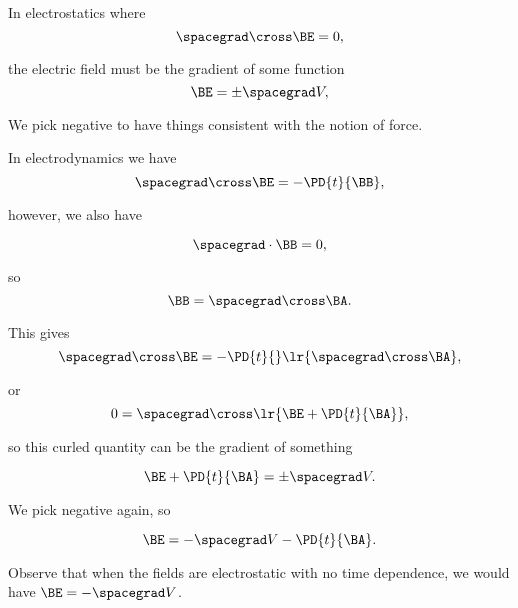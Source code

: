 In electrostatics where
\begin{dmath}\label{eqn:emtLecture10:720}
\spacegrad \cross \BE  = 0,
\end{dmath}

the electric field must be the gradient of some function
\begin{dmath}\label{eqn:emtLecture10:740}
\BE = \pm \spacegrad V,
\end{dmath}

We pick negative to have things consistent with the notion of force.

In electrodynamics we have
\begin{dmath}\label{eqn:emtLecture10:760}
\spacegrad \cross \BE = - \PD{t}{\BB},
\end{dmath}

however, we also have

\begin{dmath}\label{eqn:emtLecture10:780}
\spacegrad \cdot \BB = 0,
\end{dmath}

so
\begin{dmath}\label{eqn:emtLecture10:800}
   \BB = \spacegrad \cross \BA.
\end{dmath}

This gives
\begin{dmath}\label{eqn:emtLecture10:820}
   \spacegrad \cross \BE = - \PD{t}{} \lr{ \spacegrad \cross \BA },
\end{dmath}

or
\begin{dmath}\label{eqn:emtLecture10:840}
0 = 
\spacegrad \cross \lr{ \BE + \PD{t}{\BA} },
\end{dmath}

so this curled quantity can be the gradient of something

\begin{dmath}\label{eqn:emtLecture10:860}
\BE + \PD{t}{\BA} = \pm \spacegrad V.
\end{dmath}

We pick negative again, so

\begin{dmath}\label{eqn:emtLecture10:880}
\BE = -\spacegrad V -\PD{t}{\BA}.
\end{dmath}

Observe that when the fields are electrostatic with no time dependence, we would have \( \BE = -\spacegrad V \).


\EndNoBibArticle
